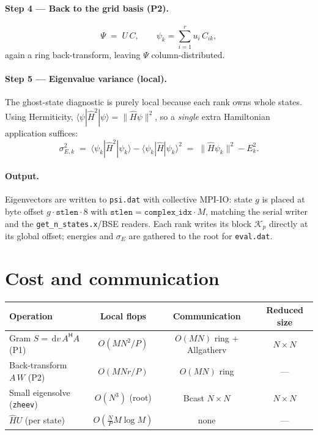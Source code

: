 \documentclass[11pt]{article}
\newcommand{\dv}{\,\mathrm{d}v\,}
\newcommand{\Herm}{^{\mathsf{H}}}
\begin{document}
\paragraph{Step 4 --- Back to the grid basis (P2).}
\begin{equation}
  \Psi \;=\; U\,C,\qquad \psi_k=\sum_{i=1}^{r} u_i\,C_{ik},
  \label{eq:psigrid}
\end{equation}
again a ring back-transform, leaving $\Psi$ column-distributed.

\paragraph{Step 5 --- Eigenvalue variance (local).} The ghost-state diagnostic is
purely local because each rank owns whole states. Using Hermiticity,
$\langle\psi|\hat H^2|\psi\rangle=\|\hat H\psi\|^2$, so a \emph{single} extra
Hamiltonian application suffices:
\begin{equation}
  \sigma_{E,k}^2
  \;=\; \langle\psi_k|\hat H^2|\psi_k\rangle - \langle\psi_k|\hat H|\psi_k\rangle^2
  \;=\; \big\|\hat H\psi_k\big\|^2 - E_k^2 .
  \label{eq:sigma}
\end{equation}

\paragraph{Output.} Eigenvectors are written to \texttt{psi.dat} with collective
MPI-IO: state $g$ is placed at byte offset
$g\cdot\texttt{stlen}\cdot 8$ with $\texttt{stlen}=\texttt{complex\_idx}\cdot M$,
matching the serial writer and the \texttt{get\_n\_states.x}/BSE readers. Each
rank writes its block $\mathcal K_p$ directly at its global offset; energies and
$\sigma_E$ are gathered to the root for \texttt{eval.dat}.

\section{Cost and communication}

\begin{center}
\renewcommand{\arraystretch}{1.25}
\begin{tabular}{@{}lccc@{}}
\toprule
Operation & Local flops & Communication & Reduced size \\
\midrule
Gram $S=\dv A\Herm A$ (P1)        & $O(MN^2/P)$ & $O(MN)$ ring + Allgatherv & $N\!\times\!N$ \\
Back-transform $A\,W$ (P2)         & $O(MNr/P)$  & $O(MN)$ ring              & --- \\
Small eigensolve (\texttt{zheev})  & $O(N^3)$ (root) & Bcast $N\!\times\!N$  & $N\!\times\!N$ \\
$\hat H U$ (per state)             & $O(\tfrac{N}{P} M\log M)$ & none          & --- \\
\bottomrule
\end{tabular}
\end{center}
\end{document}

